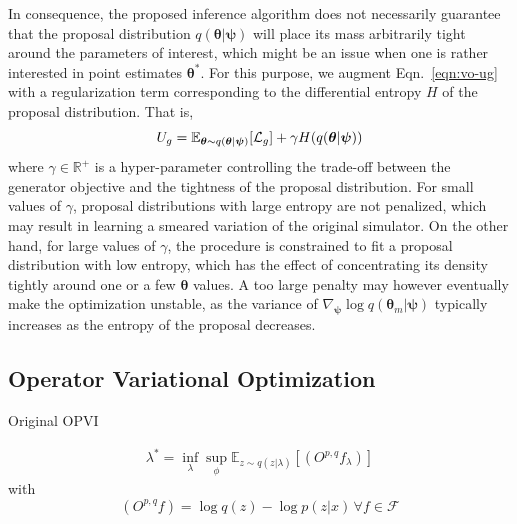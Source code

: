 \documentclass[twocolumn,superscriptaddress,aps]{revtex4-1}
\newcommand{\bftheta}{{\bm \theta}}
\newcommand{\bfpsi}{{\bm \psi}}
\theoremstyle{plain}
\begin{document}
In consequence, the proposed inference algorithm does not necessarily guarantee that the
proposal distribution $q(\bftheta|\bfpsi)$ will place its mass arbitrarily tight
around the parameters of interest, which might be an issue when one is rather interested in point estimates $\bftheta^*$.
For this purpose, we augment Eqn.~\ref{eqn:vo-ug}
with a regularization term corresponding to the differential entropy $H$ of
the proposal distribution. That is,
\begin{equation}
    U_g = \mathbb{E}_{\bftheta \sim q(\bftheta|\bfpsi)} [ {\cal L}_g ] + \gamma H(q(\bftheta|\bfpsi))
\end{equation}
where $\gamma \in \mathbb{R}^+$ is a hyper-parameter controlling the trade-off
between the generator objective and the tightness of the proposal distribution.
For small values of $\gamma$,
proposal distributions with large entropy are not penalized, which may result
in learning a smeared variation of the original simulator. On the other hand,
for large values of $\gamma$, the procedure is constrained to fit a proposal
distribution with low entropy, which has the effect of concentrating its density
tightly around one or a few $\bftheta$ values. A too large penalty may however
eventually make the optimization unstable, as the variance of $\nabla_\bfpsi \log q(\bftheta_m|\bfpsi)$
typically increases as the entropy of the proposal decreases.

\subsection{Operator Variational Optimization}

Original OPVI  \citep{2016arXiv161009033R}

\begin{eqnarray}
\lambda^* = \inf_\lambda \sup_\phi \mathbb{E}_{ z \sim q( z | \lambda)} [ (O^{p,q} f_\lambda) ] 
\end{eqnarray}
with
\begin{equation}
(O^{p,q} f) = \log q(z) - \log p(z|x) \, \forall f \in \mathcal{F}
\end{equation}


%
\end{document}
